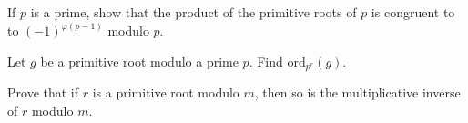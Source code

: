 \begin{problem}
	If $p$ is a prime, show that the product of the primitive roots of $p$ is congruent to to $(-1)^{\varphi(p-1)}$ modulo $p$. %
\end{problem}


\begin{problem}
	Let $g$ be a primitive root modulo a prime $p$. Find $\text{ord}_{p^r}(g)$. %
\end{problem}


\begin{problem}
	Prove that if $r$ is a primitive root modulo $m$, then so is the multiplicative inverse of $r$ modulo $m$. %
\end{problem}

